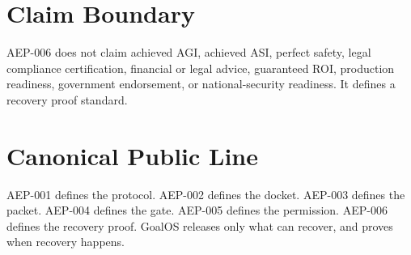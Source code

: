 \documentclass[11pt]{article}
\begin{document}
\section{Claim Boundary}
AEP-006 does not claim achieved AGI, achieved ASI, perfect safety, legal compliance certification, financial or legal advice, guaranteed ROI, production readiness, government endorsement, or national-security readiness. It defines a recovery proof standard.

\section*{Canonical Public Line}
AEP-001 defines the protocol. AEP-002 defines the docket. AEP-003 defines the packet. AEP-004 defines the gate. AEP-005 defines the permission. AEP-006 defines the recovery proof. GoalOS releases only what can recover, and proves when recovery happens.
\end{document}
